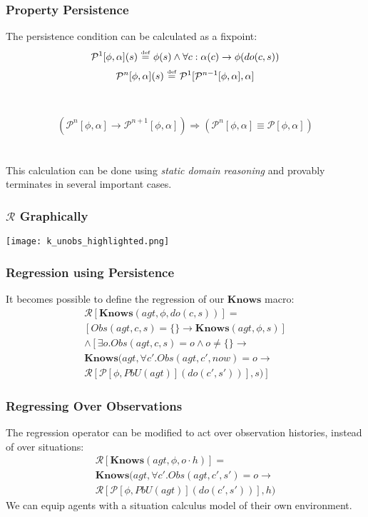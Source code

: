 \documentclass{beamer}
\newcommand{\isdef}{\hbox{$\stackrel{\mbox{\tiny def}}{=}$}}
\newcommand{\Pst}{\mathcal{P}}
\begin{document}
\begin{frame}
\frametitle{Property Persistence}
The persistence condition can be calculated as a fixpoint:
\begin{equation*}
  \Pst^{1}[\phi,\alpha](s)\ \isdef\ \phi(s) \wedge \forall c: \alpha(c) \rightarrow \phi(do(c,s))
\end{equation*}
\begin{equation*}
  \Pst^{n}[\phi,\alpha](s)\ \isdef\ \Pst^{1}[\Pst^{n-1}[\phi,\alpha],\alpha]
\end{equation*}
\ \\
\ \\
\pause
\begin{equation*}
  \left(\Pst^{n}[\phi,\alpha] \rightarrow \Pst^{n+1}[\phi,\alpha]\right) \Rightarrow \left(\Pst^{n}[\phi,\alpha] \equiv \Pst[\phi,\alpha]\right)
\end{equation*}
\ \\
\ \\
This calculation can be done using \emph{static domain reasoning} and provably terminates in several important cases.
\end{frame}

\begin{frame}
\frametitle{$\mathcal{R}$ Graphically}
\begin{center}
  \texttt{[image: k\_unobs\_highlighted.png]}
\end{center}
\end{frame}

\begin{frame}
\frametitle{Regression using Persistence}
It becomes possible to define the regression of our $\mathbf{Knows}$ macro:
\begin{multline*}
  \mathcal{R}[\mathbf{Knows}(agt,\phi,do(c,s))] = \\
     \left[ Obs(agt,c,s) = \{\} \rightarrow \mathbf{Knows}(agt,\phi,s) \right] \\
     \wedge \left[ \exists o . Obs(agt,c,s) = o \wedge o\neq \{\} \rightarrow \right. \\
     \mathbf{Knows}(agt,\forall c' . Obs(agt,c',now)=o \rightarrow \\
     \left.\mathcal{R}[\mathcal{P}[\phi,PbU(agt)](do(c',s'))],s)\right]
\end{multline*}
\end{frame}

\begin{frame}
\frametitle{Regressing Over Observations}
The regression operator can be modified to act over observation histories,
instead of over situations:
\begin{multline*}
  \mathcal{R}[\mathbf{Knows}(agt,\phi,o \cdot h)] = \\
  \mathbf{Knows}(agt,\forall c' . Obs(agt,c',s')=o \rightarrow \\
     \mathcal{R}[\mathcal{P}[\phi,PbU(agt)](do(c',s'))],h)
\end{multline*}
We can equip agents with a situation calculus model of their own environment.
\end{frame}
\end{document}
